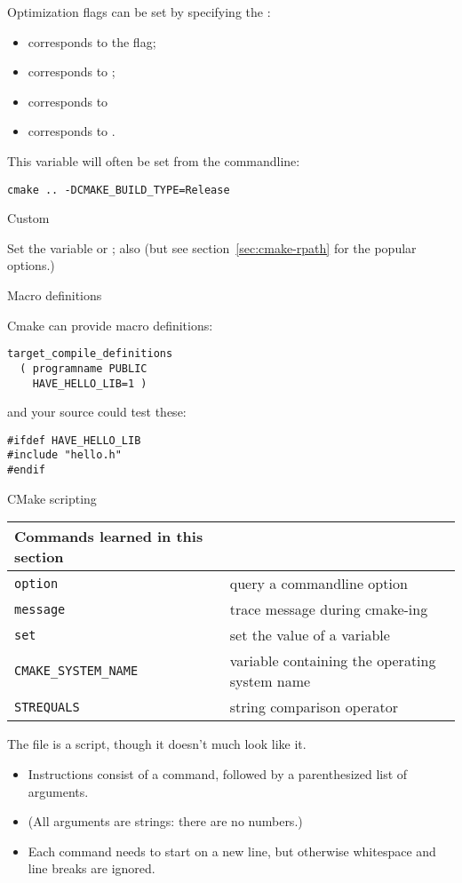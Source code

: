 Optimization flags can be set by specifying the :
\begin{itemize}
\item 
     corresponds to the  flag;
\item
     corresponds to ;
\item
     corresponds to 
\item 
     corresponds to .
\end{itemize}
This variable will often be set from the commandline:
\begin{verbatim}
cmake .. -DCMAKE_BUILD_TYPE=Release
\end{verbatim}

 {Custom}

Set the variable
or
;
also
(but see section~\ref{sec:cmake-rpath}
for the popular  options.)

 {Macro definitions}

Cmake can provide macro definitions:
\begin{lstlisting}
target_compile_definitions
  ( programname PUBLIC
    HAVE_HELLO_LIB=1 )
\end{lstlisting}
and your source could test these:
\lstset{language=C}
\begin{lstlisting}
#ifdef HAVE_HELLO_LIB
#include "hello.h"
#endif
\end{lstlisting}
\lstset{language=CMake}

 {CMake scripting}
\label{sec:cmake-script}

\begin{tabular}{lp{3in}}
  \toprule
  Commands learned in this section\\
  \midrule
  \lstinline+option+&query a commandline option\\
  \lstinline+message+&trace message during cmake-ing\\
  \lstinline+set+&set the value of a variable\\
  \lstinline+CMAKE_SYSTEM_NAME+&variable containing the operating system name\\
  \lstinline+STREQUALS+&string comparison operator\\
  \bottomrule
\end{tabular}

The  file is a script,
though it doesn't much look like it.
\begin{itemize}
\item
  Instructions consist of a command, followed by a parenthesized
  list of arguments.
\item
  (All arguments are strings: there are no numbers.)
\item
  Each command needs to start on a new line, but otherwise
  whitespace and line breaks are ignored.
\end{itemize}

